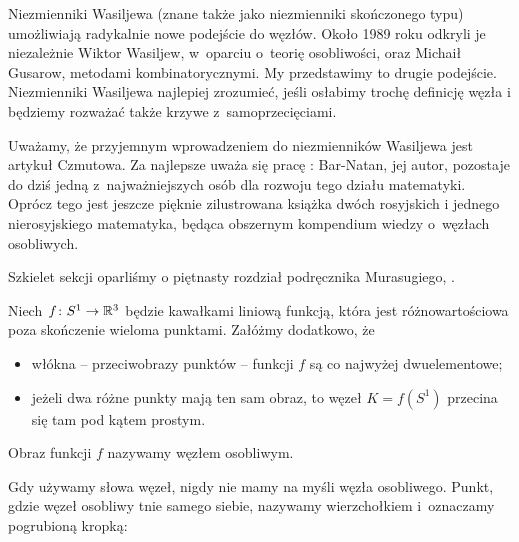 
Niezmienniki Wasiljewa (znane także jako niezmienniki skończonego typu) umożliwiają radykalnie nowe podejście do węzłów.
Około 1989 roku odkryli je niezależnie Wiktor Wasiljew, w~oparciu o~teorię osobliwości, oraz Michaił Gusarow, metodami kombinatorycznymi.
%
%
My przedstawimy to drugie podejście.
Niezmienniki Wasiljewa najlepiej zrozumieć, jeśli osłabimy trochę definicję węzła i będziemy rozważać także krzywe z~samoprzecięciami.

Uważamy, że przyjemnym wprowadzeniem do niezmienników Wasiljewa jest artykuł \cite{chmutov2012} Czmutowa.
%
Za najlepsze uważa się pracę \cite{barnatand1995}: Bar-Natan, jej autor, pozostaje do dziś jedną z~najważniejszych osób dla rozwoju tego działu matematyki.
%
Oprócz tego jest jeszcze pięknie zilustrowana książka \cite{duzhin2012} dwóch rosyjskich i jednego nierosyjskiego matematyka, będąca obszernym kompendium wiedzy o~węzłach osobliwych.
%
%

Szkielet sekcji oparliśmy o piętnasty rozdział podręcznika Murasugiego, \cite{murasugi1996}.

\begin{definition}
%
    Niech $f \colon S^1 \to \mathbb R^3$ będzie kawałkami liniową funkcją, która jest różnowartościowa poza skończenie wieloma punktami.
    Załóżmy dodatkowo, że
    \begin{itemize}
        \item włókna -- przeciwobrazy punktów -- funkcji $f$ są co najwyżej dwuelementowe;
        \item jeżeli dwa różne punkty mają ten sam obraz, to węzeł $K = f(S^1)$ przecina się tam pod kątem prostym.
    \end{itemize}
    Obraz funkcji $f$ nazywamy węzłem osobliwym.
\end{definition}

Gdy używamy słowa węzeł, nigdy nie mamy na myśli węzła osobliwego.
Punkt, gdzie węzeł osobliwy tnie samego siebie, nazywamy wierzchołkiem i~oznaczamy pogrubioną kropką:
%

